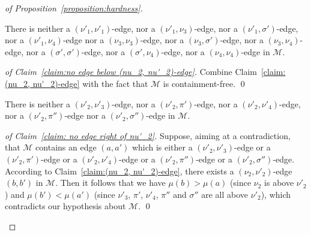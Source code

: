 \documentclass[a4paper]{llncs}
\begin{document}
\begin{proof}[of Proposition~\ref{proposition:hardness}]
  \begin{claim}
    \label{claim:no edge below (nu_2, nu'_2)-edge}
    There is
    neither a $(\nu'_1, \nu'_1)$-edge,
    nor a $(\nu'_1, \nu_3)$-edge,
    nor a $(\nu'_1, \sigma')$-edge,
    nor a $(\nu'_1, \nu_4)$-edge
    nor a $(\nu_3, \nu_3)$-edge,
    nor a $(\nu_3, \sigma')$-edge,
    nor a $(\nu_3, \nu_4)$-edge,
    nor a $(\sigma', \sigma')$-edge,
    nor a $(\sigma', \nu_4)$-edge,
    nor a $(\nu_4, \nu_4)$-edge
    in $\mathcal{M}$.
  \end{claim}

  \begin{proof}[of Claim~\ref{claim:no edge below (nu_2, nu'_2)-edge}]
    Combine Claim~\ref{claim:(nu_2, nu'_2)-edge} with the fact that
    $\mathcal{M}$ is containment-free.
    \qed
  \end{proof}

  \begin{claim}
    \label{claim: no edge right of nu'_2}
    There is
    neither a $(\nu'_2, \nu'_3)$-edge,
    nor a $(\nu'_2, \pi')$-edge,
    nor a $(\nu'_2, \nu'_4)$-edge,
    nor a $(\nu'_2, \pi'')$-edge
    nor a $(\nu'_2, \sigma'')$-edge
    in $\mathcal{M}$.
  \end{claim}

  \begin{proof}[of Claim~\ref{claim: no edge right of nu'_2}]
    Suppose, aiming at a contradiction, that
    $\mathcal{M}$ contains an edge $(a, a')$ which is
    either a $(\nu'_2, \nu'_3)$-edge
    or a $(\nu'_2, \pi')$-edge
    or a $(\nu'_2, \nu'_4)$-edge
    or a $(\nu'_2, \pi'')$-edge
    or a $(\nu'_2, \sigma'')$-edge.
    According to Claim~\ref{claim:(nu_2, nu'_2)-edge},
    there exists a $(\nu_2, \nu'_2)$-edge $(b, b')$ in $\mathcal{M}$.
    Then it follows that we have
    $\mu(b) > \mu(a)$ (since $\nu_2$ is above $\nu'_2$) and
    $\mu(b') < \mu(a')$ (since $\nu'_3$, $\pi'$, $\nu'_4$, $\pi''$ and
    $\sigma''$ are all above $\nu'_2$),
    which contradicts our hypothesis about $\mathcal{M}$.
    \qed
  \end{proof}


\end{proof}
\end{document}
